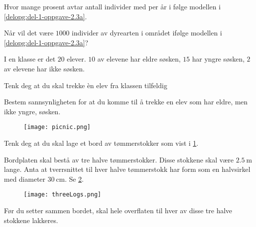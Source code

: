 \begin{oppgaver}
   Hvor mange prosent avtar antall individer med per år i følge
    modellen i \cref{delopg:del-1-oppgave-2.3a}.
\end{oppgaver}

\begin{oppgaver}
   Når vil det være $\num{1000}$ individer av dyrearten i området
    ifølge modellen i \cref{delopg:del-1-oppgave-2.3a}?
\end{oppgaver}


\Oppgave[2] 

I en klasse er det $20$ elever. $10$ av elevene har eldre søsken, $15$ har yngre
søsken, $2$ av elevene har ikke søsken. \bigskip

Tenk deg at du skal trekke èn elev fra klassen tilfeldig \bigskip

Bestem sannsynligheten for at du komme til å trekke en elev som har eldre, men
ikke yngre, søsken.


\Oppgave[3] 

\begin{figure}[htpb]
  \centering
  \texttt{[image: picnic.png]}
  \caption{}
  \label{fig:del-2-oppgave-2.5a}
\end{figure}

Tenk deg at du skal lage et bord av tømmerstokker som vist i
\cref{fig:del-2-oppgave-2.5a}. \bigskip

Bordplaten skal bestå av tre halve tømmerstokker. Disse stokkene skal være
$\SI{2.5}{\m}$ lange. Anta at tverrsnittet til hver halve tømmerstokk har form
som en halvsirkel med diameter $\SI{30}{\cm}$. Se \cref{fig:del-2-oppgave-2.5b}.


\begin{figure}[htpb]
  \centering
  \texttt{[image: threeLogs.png]}
  \caption{}
  \label{fig:del-2-oppgave-2.5b}
\end{figure}

Før du setter sammen bordet, skal hele overflaten til hver av disse tre halve
stokkene lakkeres. \bigskip

